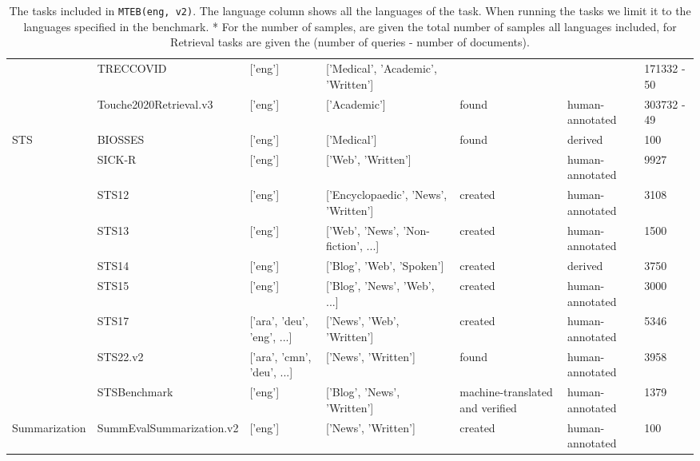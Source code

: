 \begin{table*}
{\begin{tabular}{lllllll}
 & TRECCOVID \cite{roberts2021searching} & ['eng'] & ['Medical', 'Academic', 'Written'] & & & 171332 - 50 \\
 & Touche2020Retrieval.v3 \cite{Thakur_etal_SIGIR2024} & ['eng'] & ['Academic'] & found & human-annotated & 303732 - 49 \\
\cline{1-7}
\multirow[t]{9}{*}{STS} & BIOSSES \cite{10.1093/bioinformatics/btx238} & ['eng'] & ['Medical'] & found & derived & 100 \\
 & SICK-R \cite{marelli-etal-2014-sick} & ['eng'] & ['Web', 'Written'] & & human-annotated & 9927 \\
 & STS12 \cite{10.5555/2387636.2387697} & ['eng'] & ['Encyclopaedic', 'News', 'Written'] & created & human-annotated & 3108 \\
 & STS13 \cite{Agirre2013SEM2S} & ['eng'] & ['Web', 'News', 'Non-fiction', ...] & created & human-annotated & 1500 \\
 & STS14 \cite{bandhakavi-etal-2014-generating} & ['eng'] & ['Blog', 'Web', 'Spoken'] & created & derived & 3750 \\
 & STS15 \cite{bicici-2015-rtm} & ['eng'] & ['Blog', 'News', 'Web', ...] & created & human-annotated & 3000 \\
 & STS17 \cite{cer-etal-2017-semeval} & ['ara', 'deu', 'eng', ...] & ['News', 'Web', 'Written'] & created & human-annotated & 5346 \\
 & STS22.v2 \cite{chen-etal-2022-semeval} & ['ara', 'cmn', 'deu', ...] & ['News', 'Written'] & found & human-annotated & 3958 \\
 & STSBenchmark \cite{huggingface:dataset:stsb_multi_mt} & ['eng'] & ['Blog', 'News', 'Written'] & machine-translated and verified & human-annotated & 1379 \\
\cline{1-7}
Summarization & SummEvalSummarization.v2 \cite{fabbri2020summeval} & ['eng'] & ['News', 'Written'] & created & human-annotated & 100 \\
\cline{1-7}
\bottomrule
\end{tabular}


}
\caption{The tasks included in \texttt{MTEB(eng, v2)}. The language column shows all the languages of the task. When running the tasks we limit it to the languages specified in the benchmark. * For the number of samples, are given the total number of samples all languages included, for Retrieval tasks are given the (number of queries - number of documents).}
\label{tab:mteb_lite_task_overview}
\end{table*}